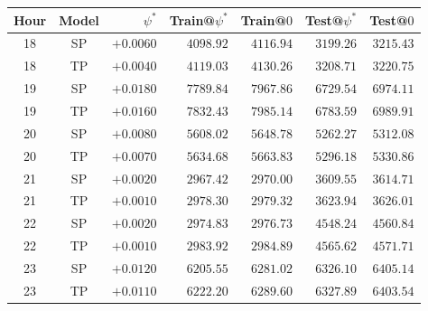 \documentclass[sigconf, review]{acmart}
\begin{document}
~\newpage
~\newpage


\begin{table}[H]
\centering
\caption{}
\label{tab:stadium-psi-mse}
\begin{tabular}{ccrrrrr}
\toprule
Hour & Model & $\psi^{*}$ & Train@$\psi^{*}$ & Train@$0$ & Test@$\psi^{*}$ & Test@$0$ \\
\midrule
18 & SP & $+0.0060$ & $4098.92$ & $4116.94$ & $3199.26$ & $3215.43$ \\
18 & TP & $+0.0040$ & $4119.03$ & $4130.26$ & $3208.71$ & $3220.75$ \\
\midrule
19 & SP & $+0.0180$ & $7789.84$ & $7967.86$ & $6729.54$ & $6974.11$ \\
19 & TP & $+0.0160$ & $7832.43$ & $7985.14$ & $6783.59$ & $6989.91$ \\
\midrule
20 & SP & $+0.0080$ & $5608.02$ & $5648.78$ & $5262.27$ & $5312.08$ \\
20 & TP & $+0.0070$ & $5634.68$ & $5663.83$ & $5296.18$ & $5330.86$ \\
\midrule
21 & SP & $+0.0020$ & $2967.42$ & $2970.00$ & $3609.55$ & $3614.71$ \\
21 & TP & $+0.0010$ & $2978.30$ & $2979.32$ & $3623.94$ & $3626.01$ \\
\midrule
22 & SP & $+0.0020$ & $2974.83$ & $2976.73$ & $4548.24$ & $4560.84$ \\
22 & TP & $+0.0010$ & $2983.92$ & $2984.89$ & $4565.62$ & $4571.71$ \\
\midrule
23 & SP & $+0.0120$ & $6205.55$ & $6281.02$ & $6326.10$ & $6405.14$ \\
23 & TP & $+0.0110$ & $6222.20$ & $6289.60$ & $6327.89$ & $6403.54$ \\
\bottomrule
\end{tabular}
\end{table}
\end{document}
